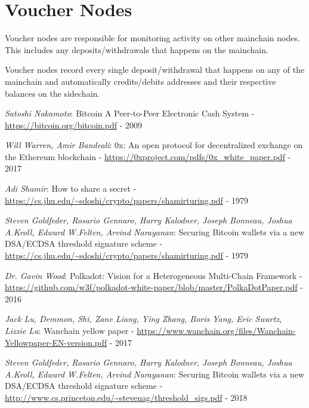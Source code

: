 \documentclass{Bigpool}
\begin{document}

\section{Voucher Nodes}
Voucher nodes are responsible for monitoring activity on other mainchain nodes. This includes any deposits/withdrawals that happens on the mainchain. 

Voucher nodes record every single deposit/withdrawal that happens on any of the mainchain and automatically credits/debits addresses and their respective balances on the sidechain.



\begin{thebibliography}{99}
	\textit{Satoshi Nakamoto}: Bitcoin A Peer-to-Peer Electronic Cash System - \url{https://bitcoin.org/bitcoin.pdf} - 2009

	\textit{Will Warren, Amir Bandeali}: 0x: An open protocol for decentralized exchange on the Ethereum blockchain - \url{https://0xproject.com/pdfs/0x_white_paper.pdf} - 2017

	\textit{Adi Shamir}: How to share a secret - \url{https://cs.jhu.edu/~sdoshi/crypto/papers/shamirturing.pdf} - 1979

	\textit{Steven Goldfeder, Rosario Gennaro, Harry Kalodner, Joseph Bonneau, Joshua A.Kroll, Edward W.Felten, Arvind Narayanan}: Securing Bitcoin wallets via a new DSA/ECDSA threshold signature scheme - \url{https://cs.jhu.edu/~sdoshi/crypto/papers/shamirturing.pdf} - 1979

	\textit{Dr. Gavin Wood}: Polkadot: Vision for a Heterogeneous Multi-Chain Framework - \url{https://github.com/w3f/polkadot-white-paper/blob/master/PolkaDotPaper.pdf} - 2016

	\textit{Jack Lu, Demmon, Shi, Zane Liang, Ying Zhang, Boris Yang, Eric Swartz, Lizzie Lu}: Wanchain yellow paper - \url{https://www.wanchain.org/files/Wanchain-Yellowpaper-EN-version.pdf} - 2017
	
	\textit{Steven Goldfeder, Rosario Gennaro, Harry Kalodner, Joseph Bonneau, Joshua A.Kroll, Edward W.Felten, Arvind Narayanan}: Securing Bitcoin wallets via a new DSA/ECDSA threshold signature scheme - \url{http://www.cs.princeton.edu/~stevenag/threshold_sigs.pdf} - 2018
	
\end{thebibliography}
\end{document}
